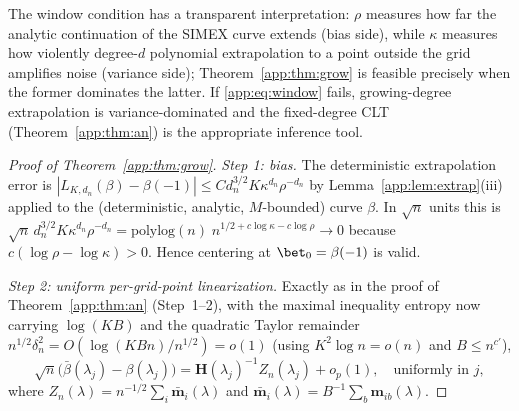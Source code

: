 \begin{remark}
The window condition has a transparent interpretation: $\rho$ measures
how far the analytic continuation of the SIMEX curve extends (bias
side), while $\kappa$ measures how violently degree-$d$ polynomial
extrapolation to a point outside the grid amplifies noise (variance
side); Theorem~\ref{app:thm:grow} is feasible precisely when the former
dominates the latter. If \eqref{app:eq:window} fails, growing-degree
extrapolation is variance-dominated and the fixed-degree CLT
(Theorem~\ref{app:thm:an}) is the appropriate inference tool.
\end{remark}

\begin{proof}[Proof of Theorem~\ref{app:thm:grow}]
\emph{Step 1: bias.} The deterministic extrapolation error is
$|L_{K,d_n}(\beta)-\beta(-1)|\le C d_n^{3/2}K\kappa^{d_n}\rho^{-d_n}$ by
Lemma~\ref{app:lem:extrap}(iii) applied to the (deterministic, analytic,
$M$-bounded) curve $\beta$. In $\sqrt n$ units this is
$\sqrt n\,d_n^{3/2}K\kappa^{d_n}\rho^{-d_n}
= \mathrm{polylog}(n)\;n^{1/2+c\log\kappa-c\log\rho}\to0$
because $c(\log\rho-\log\kappa)>0$. Hence centering at $\bet_0=\beta(-1)$
is valid.

\emph{Step 2: uniform per-grid-point linearization.} Exactly as in the
proof of Theorem~\ref{app:thm:an} (Step~1--2), with the maximal inequality
entropy now carrying $\log(KB)$ and the quadratic Taylor remainder
$n^{1/2}\delta_n^2=O(\log(KBn)/n^{1/2})=o(1)$ (using
$K^2\log n=o(n)$ and $B\le n^{c'}$),
\[
  \sqrt n\bigl(\bar\beta(\lambda_j)-\beta(\lambda_j)\bigr)
  =\bm H(\lambda_j)^{-1}Z_n(\lambda_j)+o_p(1),
  \quad\text{uniformly in }j,
\]
where $Z_n(\lambda)=n^{-1/2}\sum_i\bar{\bm m}_i(\lambda)$ and
$\bar{\bm m}_i(\lambda)=B^{-1}\sum_b\bm m_{ib}(\lambda)$.


\end{proof}
